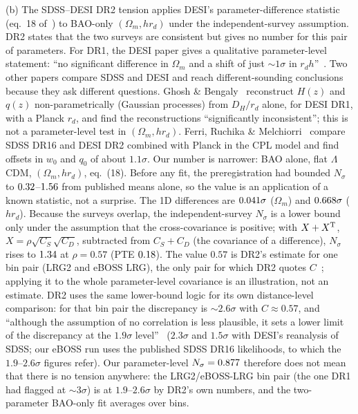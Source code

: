 \documentclass[11pt]{article}
\begin{document}
(b) The SDSS--DESI DR2 tension applies DESI's parameter-difference statistic (eq.~18 of~\cite{desi2025dr2}) to BAO-only $(\Omega_m, hr_d)$ under the
independent-survey assumption. DR2 states that the two surveys are consistent but gives no number for this pair of parameters. For DR1, the DESI
paper gives a qualitative parameter-level statement: ``no significant difference in $\Omega_m$ and a shift of just $\sim1\sigma$ in $r_dh$''~\cite[Sec.~3.3]{desi2024vi}.
Two other papers compare SDSS and DESI and reach different-sounding conclusions because they ask different questions. Ghosh \&
Bengaly~\cite{ghosh2024} reconstruct $H(z)$ and $q(z)$ non-parametrically (Gaussian processes) from $D_H/r_d$ alone, for DESI DR1, with a Planck
$r_d$, and find the reconstructions ``significantly inconsistent''; this is not a parameter-level test in $(\Omega_m, hr_d)$. Ferri, Ruchika \&
Melchiorri~\cite{ferri2026} compare SDSS DR16 and DESI DR2 combined with Planck in the CPL model and find offsets in $w_0$ and $q_0$ of about
$1.1\sigma$. Our number is narrower: BAO alone, flat $\Lambda$CDM, $(\Omega_m, hr_d)$, eq.~(18). Before any fit, the preregistration had bounded $N_\sigma$ to
$0.32$--$1.56$ from published means alone, so the value is an application of a known statistic, not a surprise. The 1D
differences are $0.041\sigma$ ($\Omega_m$) and $0.668\sigma$ ($hr_d$). Because the surveys overlap, the independent-survey $N_\sigma$ is a lower
bound only under the assumption that the cross-covariance is positive; with $X+X^{\rm T}$, $X=\rho\sqrt{C_S}\sqrt{C_D}$, subtracted from $C_S+C_D$ (the covariance of a
difference), $N_\sigma$ rises to
$1.34$ at $\rho=0.57$ (PTE $0.18$). The value $0.57$ is DR2's estimate for one bin pair (LRG2 and eBOSS LRG), the only pair for which DR2 quotes $C$~\cite[Sec.~III.C.2]{desi2025dr2};
applying it to the whole parameter-level covariance is an illustration, not an estimate. DR2 uses the same lower-bound logic for its own distance-level comparison:
for that bin pair the discrepancy is $\sim2.6\sigma$ with $C\approx0.57$, and ``although the assumption of no correlation is less plausible, it sets a lower limit of the
discrepancy at the $1.9\sigma$ level''~\cite[Sec.~III.C.2]{desi2025dr2} ($2.3\sigma$ and $1.5\sigma$ with DESI's reanalysis of SDSS; our eBOSS run uses the
published SDSS DR16 likelihoods, to which the $1.9$--$2.6\sigma$ figures refer). Our parameter-level $N_\sigma=0.877$ therefore does not mean that there is no tension anywhere: the
LRG2/eBOSS-LRG bin pair (the one DR1 had flagged at $\sim3\sigma$) is at $1.9$--$2.6\sigma$ by DR2's own numbers, and the two-parameter BAO-only fit averages over bins.
\end{document}
